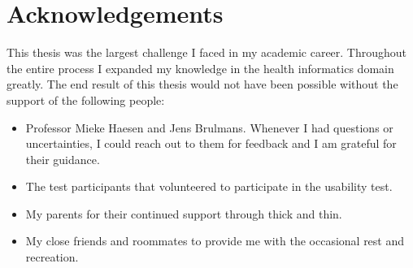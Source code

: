 \section*{Acknowledgements}

This thesis was the largest challenge I faced in my academic career. Throughout the entire process I expanded my knowledge in the health informatics domain greatly. The end result of this thesis would not have been possible without the support of the following people:
\begin{itemize}
    \item Professor Mieke Haesen and Jens Brulmans. Whenever I had questions or uncertainties, I could reach out to them for feedback and I am grateful for their guidance.
    \item The test participants that volunteered to participate in the usability test.
    \item My parents for their continued support through thick and thin.
    \item My close friends and roommates to provide me with the occasional rest and recreation.
\end{itemize}